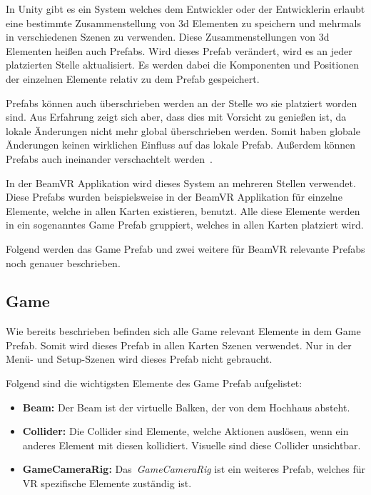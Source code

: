In Unity gibt es ein System welches dem Entwickler oder der Entwicklerin erlaubt eine bestimmte Zusammenstellung von 3d Elementen zu speichern und mehrmals in verschiedenen Szenen zu verwenden.
Diese Zusammenstellungen von 3d Elementen heißen auch Prefabs.
Wird dieses Prefab verändert, wird es an jeder platzierten Stelle aktualisiert.
Es werden dabei die Komponenten und Positionen der einzelnen Elemente relativ zu dem Prefab gespeichert.

Prefabs können auch überschrieben werden an der Stelle wo sie platziert worden sind.
Aus Erfahrung zeigt sich aber, dass dies mit Vorsicht zu genießen ist, da lokale Änderungen nicht mehr global überschrieben werden.
Somit haben globale Änderungen keinen wirklichen Einfluss auf das lokale Prefab.
Außerdem können Prefabs auch ineinander verschachtelt werden~\cite{Unity_Prefabs}.

In der BeamVR Applikation wird dieses System an mehreren Stellen verwendet.
Diese Prefabs wurden beispielsweise in der BeamVR Applikation für einzelne Elemente, welche in allen Karten existieren, benutzt.
Alle diese Elemente werden in ein sogenanntes Game Prefab gruppiert, welches in allen Karten platziert wird.

Folgend werden das Game Prefab und zwei weitere für BeamVR relevante Prefabs noch genauer beschrieben.

\subsection{Game}\label{subsec:game-prefab}

Wie bereits beschrieben befinden sich alle Game relevant Elemente in dem Game Prefab.
Somit wird dieses Prefab in allen Karten Szenen verwendet.
Nur in der Menü- und Setup-Szenen wird dieses Prefab nicht gebraucht.

Folgend sind die wichtigsten Elemente des Game Prefab aufgelistet:

\begin{itemize}
    \item \textbf{Beam:} Der Beam ist der virtuelle Balken, der von dem Hochhaus absteht.
    \item \textbf{Collider:} Die Collider sind Elemente, welche Aktionen auslösen, wenn ein anderes Element mit diesen kollidiert.
    Visuelle sind diese Collider unsichtbar.
    \item \textbf{GameCameraRig:} Das~\emph{GameCameraRig} ist ein weiteres Prefab, welches für VR spezifische Elemente zuständig ist.
\end{itemize}


